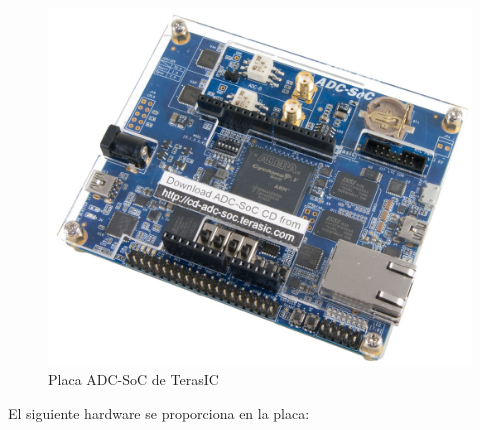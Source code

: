 \begin{figure}
\centering
\includegraphics[scale=0.15]{./Figures/ADC-SoC.jpg}
\caption{Placa ADC-SoC de TerasIC}
\end{figure}

El siguiente hardware se proporciona en la placa:


